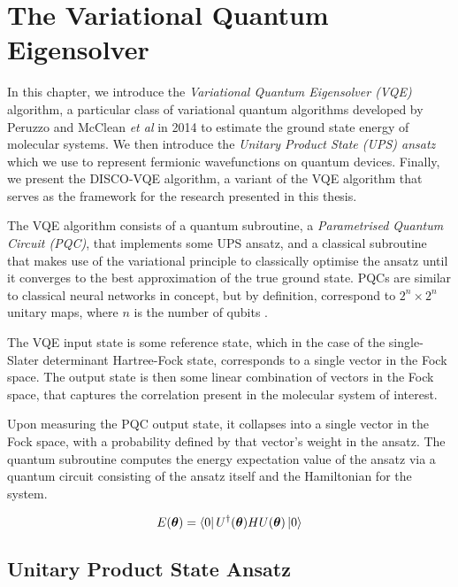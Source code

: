 \section{The Variational Quantum Eigensolver}%
\label{vqe}

In this chapter, we introduce the \textit{Variational Quantum Eigensolver (VQE)} algorithm, a particular class of variational quantum algorithms developed by Peruzzo and McClean \textit{et al} \cite{Peruzzo2014} in 2014 to estimate the ground state energy of molecular systems. We then introduce the \textit{Unitary Product State (UPS) ansatz} which we use to represent fermionic wavefunctions on quantum devices. Finally, we present the DISCO-VQE algorithm, a variant of the VQE algorithm that serves as the framework for the research presented in this thesis.

The VQE algorithm consists of a quantum subroutine, a \textit{Parametrised Quantum Circuit (PQC)}, that implements some UPS ansatz, and a classical subroutine that makes use of the variational principle to classically optimise the ansatz until it converges to the best approximation of the true ground state. PQCs are similar to classical neural networks in concept, but by definition, correspond to $2^n \times 2^n$ unitary maps, where $n$ is the number of qubits \cite{Yeung2020}.

The VQE input state is some reference state, which in the case of the single-Slater determinant Hartree-Fock state, corresponds to a single vector in the Fock space. The output state is then some linear combination of vectors in the Fock space, that captures the correlation present in the molecular system of interest.

Upon measuring the PQC output state, it collapses into a single vector in the Fock space, with a probability defined by that vector's weight in the ansatz. The quantum subroutine computes the energy expectation value of the ansatz via a quantum circuit consisting of the ansatz itself and the Hamiltonian for the system.

\begin{equation*}
    E(\bm\theta) = \bra{0} U^\dagger(\bm\theta) H U(\bm\theta) \ket{0} 
\end{equation*}


\subsection{Unitary Product State Ansatz}%
\label{ups-ansatz}

